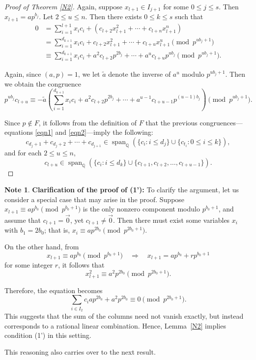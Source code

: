 \documentclass{article}
\theoremstyle{Theorem}
\theoremstyle{definition}
\newtheorem{note}[thm]{Note}
\begin{document}
\begin{proof}[Proof of Theorem \ref{N2}]
Again, suppose \( x_{l+1} \in I_{j+1} \) for some \( 0 \leq j \leq s \). Then \( x_{l+1} = a p^{b_j} \). Let \( 2 \leq u \leq n \). Then there exists \( 0 \leq k \leq s \) such that
\begin{align*}
    0 &= \sum_{i=1}^{l+1} x_i c_i + \left( c_{l+2} x_{l+1}^2 + \cdots + c_{l+n} x_{l+1}^n \right) \\
      &= \sum_{i=1}^{d_{k+1}} x_i c_i + c_{l+2} x_{l+1}^2 + \cdots + c_{l+u} x_{l+1}^u \pmod{p^{u b_j + 1}} \\
      &\equiv \sum_{i=1}^{d_{k+1}} x_i c_i + a^2 c_{l+2} p^{2 b_j} + \cdots + a^u c_{l+u} p^{u b_j} \pmod{p^{u b_j + 1}}.
\end{align*}


Again, since \( (a, p) = 1 \), we let \( \tilde{a} \) denote the inverse of \( a^u \) modulo \( p^{u b_j + 1} \). Then we obtain the congruence
\begin{equation}\label{eqn2}
    p^{u b_j} c_{l+u} \equiv -\tilde{a} \left( \sum_{i=1}^{d_{k+1}} x_i c_i + a^2 c_{l+2} p^{2 b_j} + \cdots + a^{u-1} c_{l+u-1} p^{(u-1) b_j} \right) \pmod{p^{u b_j + 1}}.
\end{equation}




Since \( p \notin F \), it follows from the definition of \( F \) that the previous congruences—equations \eqref{eqn1} and \eqref{eqn2}—imply the following:
\[
c_{d_j+1} + c_{d_j+2} + \cdots + c_{d_{j+1}} \in \operatorname{span}_{\mathbb{Q}} \left( \{ c_i : i \leq d_j \} \cup \{ c_{t_i} : 0 \leq i \leq k \} \right),
\]
and for each \( 2 \leq u \leq n \),
\[
c_{l+u} \in \operatorname{span}_{\mathbb{Q}} \left( \{ c_i : i \leq d_k \} \cup \{ c_{l+1}, c_{l+2}, \dots, c_{l+u-1} \} \right).
\]

\end{proof}


\begin{note}\label{note}
\textbf{Clarification of the proof of (1'):}  
To clarify the argument, let us consider a special case that may arise in the proof. Suppose \( x_{l+1} \equiv a p^{b_0} \pmod{p^{b_0+1}} \) is the only nonzero component modulo \( p^{b_0+1} \), and assume that \( c_{l+1} = \vec{0} \), yet \( c_{l+1} \neq \vec{0} \). Then there must exist some variables \( x_i \) with \( b_1 = 2b_0 \); that is, \( x_i \equiv a p^{2b_0} \pmod{p^{2b_0+1}} \).

On the other hand, from
\[
x_{l+1} \equiv a p^{b_0} \pmod{p^{b_0+1}} \quad \Rightarrow \quad x_{l+1} = a p^{b_0} + r p^{b_0+1}
\]
for some integer \( r \), it follows that
\[
x_{l+1}^2 \equiv a^2 p^{2b_0} \pmod{p^{2b_0+1}}.
\]

Therefore, the equation becomes
\[
\sum_{i \in I_2} c_i a p^{2b_0} + a^2 p^{2b_0} \equiv 0 \pmod{p^{2b_0+1}}.
\]
This suggests that the sum of the columns need not vanish exactly, but instead corresponds to a rational linear combination. Hence, Lemma~\ref{N2} implies condition (1') in this setting.

This reasoning also carries over to the next result.
\end{note}
\end{document}
